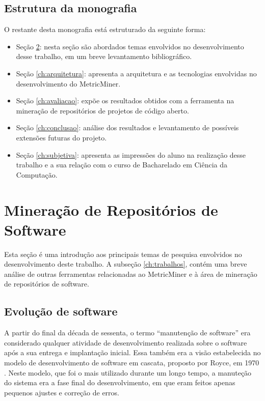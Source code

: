 \documentclass[a4paper, 12pt, twoside]{book}
\begin{document}
    \section{Estrutura da monografia}
        O restante desta monografia está estruturado da seguinte forma: 
        \begin{itemize}
            \item Seção \ref{ch:conceitos}: nesta seção são abordados temas 
                envolvidos no desenvolvimento desse trabalho, em um breve levantamento bibliográfico.
            \item Seção \ref{ch:arquitetura}: apresenta a arquitetura e as tecnologias
            envolvidas no desenvolvimento do MetricMiner.
            \item Seção \ref{ch:avaliacao}: expõe os resultados obtidos com a ferramenta 
                na mineração de repositórios de projetos de código aberto.
            \item Seção \ref{ch:conclusao}: análise dos resultados e levantamento 
                de possíveis extensões futuras do projeto.
            \item Seção \ref{ch:subjetiva}: apresenta as impressões do aluno na realização 
                desse trabalho e a sua relação com o curso de Bacharelado em Ciência da Computação.
        \end{itemize}
    
\chapter{Mineração de Repositórios de Software} \label{ch:conceitos}
    Esta seção é uma introdução aos principais temas de pesquisa envolvidos no desenvolvimento
    deste trabalho. A subseção \ref{ch:trabalhos}, contém uma breve análise de outras ferramentas
    relacionadas ao MetricMiner e à área de mineração de repositórios de software.

    \section{Evolução de software}
        A partir do final da década de sessenta, o termo ``manutenção de software'' era 
        considerado qualquer atividade de desenvolvimento realizada sobre o software após a sua
        entrega e implantação inicial. Essa também era a visão estabelecida no modelo de
        desenvolvimento de software em cascata, proposto por Royce, em 1970 
        \cite{DBLP:series/springer/Mens08}. Neste modelo, que foi o mais utilizado durante um 
        longo tempo, a manuteção do sistema era a fase final do desenvolvimento, em que eram 
        feitos apenas pequenos ajustes e correção de erros.
        
\end{document}
